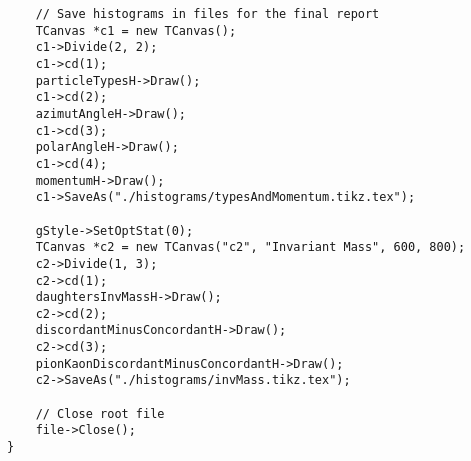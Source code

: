 \documentclass{article}
\begin{document}
\begin{verbatim}
    // Save histograms in files for the final report
    TCanvas *c1 = new TCanvas();
    c1->Divide(2, 2);
    c1->cd(1);
    particleTypesH->Draw();
    c1->cd(2);
    azimutAngleH->Draw();
    c1->cd(3);
    polarAngleH->Draw();
    c1->cd(4);
    momentumH->Draw();
    c1->SaveAs("./histograms/typesAndMomentum.tikz.tex");

    gStyle->SetOptStat(0);
    TCanvas *c2 = new TCanvas("c2", "Invariant Mass", 600, 800);
    c2->Divide(1, 3);
    c2->cd(1);
    daughtersInvMassH->Draw();
    c2->cd(2);
    discordantMinusConcordantH->Draw();
    c2->cd(3);
    pionKaonDiscordantMinusConcordantH->Draw();
    c2->SaveAs("./histograms/invMass.tikz.tex");

    // Close root file
    file->Close();
}
\end{verbatim}
\end{document}
